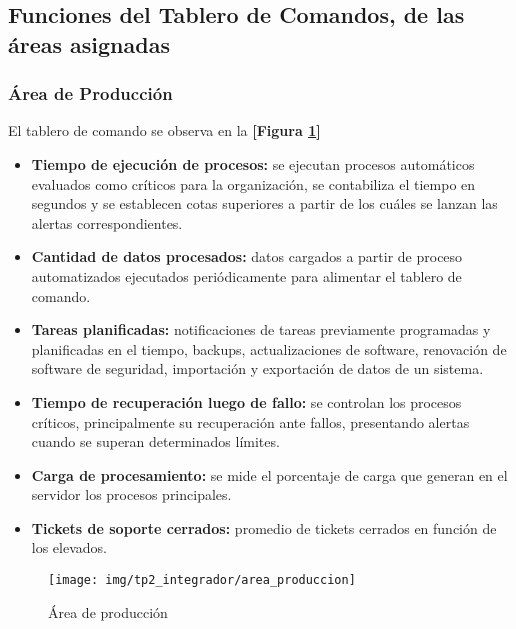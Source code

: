 \begin{itemize}
\begin{itemize}
                \end{itemize}
            \end{itemize}   

            
            
            
\newpage
    \subsection{Funciones del Tablero de Comandos, de las áreas asignadas} %
    
    \subsubsection{Área de Producción}
	    El tablero de comando se observa en la \textbf{[Figura \ref{area_prod}]}
    	\begin{itemize}
			\item\textbf{Tiempo de ejecución de procesos:} se ejecutan procesos automáticos evaluados como críticos para la organización, se contabiliza el tiempo en segundos y se establecen cotas superiores a partir de los cuáles se lanzan las alertas correspondientes.
            \item\textbf{Cantidad de datos procesados:} datos cargados a partir de proceso automatizados ejecutados periódicamente para alimentar el tablero de comando.
            \item\textbf{Tareas planificadas:} notificaciones de tareas previamente programadas y planificadas en el tiempo, backups, actualizaciones de software, renovación de software de seguridad, importación y exportación de datos de un sistema.
            \item\textbf{Tiempo de recuperación luego de fallo:} se controlan los procesos críticos, principalmente su recuperación ante fallos, presentando alertas cuando se superan determinados límites.
            \item \textbf{Carga de procesamiento: }se mide el porcentaje de carga que generan en el servidor los procesos principales.
            \item \textbf{Tickets de soporte cerrados: }promedio de tickets cerrados en función de los elevados.
		\end{itemize}
        
	\begin{figure}[h]
	  \centering
  	  \texttt{[image: img/tp2\_integrador/area\_produccion]}
      \label{area_prod}
      \caption{Área de producción}
	\end{figure}
    
